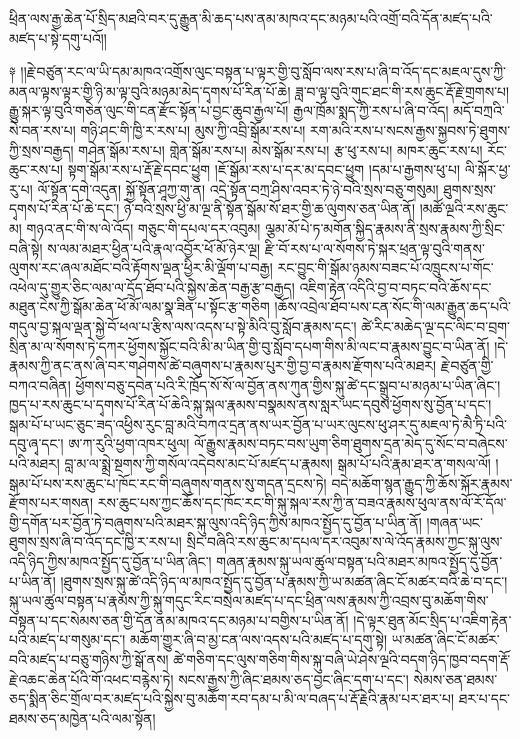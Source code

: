 \documentclass{article}
\begin{document}
ཕྲིན་ལས་རྒྱ་ཆེན་པོ་སྲིད་མཐའི་བར་དུ་རྒྱུན་མི་ཆད་པས་ནམ་མཁའ་དང་མཉམ་པའི་འགྲོ་བའི་དོན་མཛད་པའི་མཛད་པ་སྟེ་དགུ་པའོ།།

༈ །།རྗེ་བཙུན་རང་ལ་ཡི་དམ་མཁའ་འགྲོས་ལུང་བསྟན་པ་ལྟར་གྱི་བུ་སློབ་ལས་རས་པ་ཞི་བ་འོད་དང་མཇལ་དུས་ཀྱི་མནལ་ལྟས་ལྟར་གྱི་ཉི་མ་ལྟ་བུའི་མཉམ་མེད་དྭགས་པོ་རིན་པོ་ཆེ། ཟླ་བ་ལྟ་བུའི་གུང་ཐང་གི་རས་ཆུང་རྡོ་རྗེ་གྲགས་པ། རྒྱུ་སྐར་ལྟ་བུའི་གཅེན་ལུང་གི་ངན་རྫོང་སྟོན་པ་བྱང་ཆུབ་རྒྱལ་པོ། རྒྱལ་ཁྲོམ་སྨད་ཀྱི་རས་པ་ཞི་བ་འོད། མདོ་བཀྲའི་སེ་བན་རས་པ། གཉི་ཤང་གི་ཁྱི་ར་རས་པ། མུས་ཀྱི་འབྲི་སྒོམ་རས་པ། རག་མའི་རས་པ་སངས་རྒྱས་སྐྱབས་ཏེ་ཐུགས་ཀྱི་སྲས་བརྒྱད། གཤེན་སྒོམ་རས་པ། གླེན་སྒོམ་རས་པ། མེས་སྒོམ་རས་པ། རྩ་ཕུ་རས་པ། མཁར་ཆུང་རས་པ། རོང་ཆུང་རས་པ། སྟག་སྒོམ་རས་པ་རྡོ་རྗེ་དབང་ཕྱུག །ཇོ་སྒོམ་རས་པ་དར་མ་དབང་ཕྱུག །དམ་པ་རྒྱགས་ཕུ་པ། ལི་སྐོར་ཕྱ་རུ་པ། ལོ་སྟོན་དགེ་འདུན། སྐྱོ་སྟོན་ཤཱཀྱ་གུ་ན། འདྲེ་སྟོན་བཀྲ་ཤིས་འབར་ཏེ་ཉེ་བའི་སྲས་བཅུ་གསུམ། ཐུགས་སྲས་དྭགས་པོ་རིན་པོ་ཆེ་དང་། ཉེ་བའི་སྲས་ཕྱི་མ་ལྔ་ནི་སྟོན་སྒོམ་སོ་ཐར་གྱི་ཆ་ལུགས་ཅན་ཡིན་ནོ། །མཚོ་ལྔའི་རས་ཆུང་མ། གཉའ་ནང་གི་ས་ལེ་འོད། གཅུང་གི་དཔལ་དར་འབུམ། ལྕམ་མོ་པེ་ཏ་མགོན་སྐྱིད་རྣམས་ནི་སྲས་རྣམས་ཀྱི་སྲིང་བཞི་སྟེ། ས་ལམ་མཐར་ཕྱིན་པའི་རྣལ་འབྱོར་ཕོ་མོ་ཉེར་ལྔ། རྫི་བོ་རས་པ་ལ་སོགས་ཏེ་སྐར་ཕྲན་ལྟ་བུའི་གནས་ལུགས་རང་ཞལ་མཐོང་བའི་རྟོགས་ལྡན་ཕྱིར་མི་ལྡོག་པ་བརྒྱ། རང་བྱུང་གི་སྒོམ་ཉམས་བཟང་པོ་འཁྲུངས་པ་གོང་འཕེལ་དུ་གྱུར་ཅིང་ལམ་ལ་དྲོད་ཐོབ་པའི་སྐྱེས་ཆེན་བརྒྱ་རྩ་བརྒྱད། འཇིག་རྟེན་འདིའི་བྱ་བ་བཏང་བའི་ཆོས་དང་མཐུན་ངེས་ཀྱི་སྒོམ་ཆེན་ཕོ་མོ་ལམ་སྣ་ཟིན་པ་སྟོང་རྩ་གཅིག །ཆོས་འབྲེལ་ཐོབ་པས་ངན་སོང་གི་ལམ་རྒྱུན་ཆད་པའི་གདུལ་བྱ་སྐལ་ལྡན་སྐྱེ་བོ་ཕལ་པ་རྩིས་ལས་འདས་པ་སྟེ་མིའི་བུ་སློབ་རྣམས་དང་། ཚེ་རིང་མཆེད་ལྔ་དང་ལིང་བ་བྲག་སྲིན་མ་ལ་སོགས་ཏེ་དཀར་ཕྱོགས་སྐྱོང་བའི་མི་མ་ཡིན་གྱི་བུ་སློབ་དཔག་གིས་མི་ལང་བ་རྣམས་བྱུང་བ་ཡིན་ནོ། །དེ་རྣམས་ཀྱི་ནང་ནས་ཞི་བར་གཤེགས་ཚེ་བཞུགས་པ་རྣམས་པུར་གྱི་བྱ་བ་རྣམས་རྫོགས་པའི་མཐར། རྗེ་བཙུན་གྱི་བཀའ་བཞིན། ཕྱོགས་བཅུ་དབེན་པའི་རི་ཁྲོད་སོ་སོ་ལ་བྱོན་ནས་ཀུན་གྱིས་སྐུ་ཚེ་དང་སྒྲུབ་པ་མཉམ་པ་ཡིན་ཞིང་། ཁྱད་པ་རས་ཆུང་པ་དྭགས་པོ་རིན་པོ་ཆེའི་སྐུ་སྐལ་རྣམས་བསྣམས་ནས་སླར་ཡང་དབུས་ཕྱོགས་སུ་བྱོན་པ་དང་། སྒམ་པོ་པ་ཡང་ཅུང་ཟད་འཕྱིས་རུང་བླ་མའི་བཀའ་དྲན་ནས་ཡར་བྱོན་པ་ཡར་ལུངས་ཕུ་ཤར་དུ་མཇལ་ཏེ་མཻ་ཏྲི་པའི་དབུ་ཞྭ་དང་། ཨ་ཀ་རུའི་ཕྱག་འཁར་ཕུལ། ལོ་རྒྱུས་རྣམས་བཏང་བས་ཡུག་ཅིག་ཐུགས་དྲན་མེད་དུ་སོང་བ་བཞེངས་པའི་མཐར། བླ་མ་ལ་སྨྲེ་སྔགས་ཀྱི་གསོལ་འདེབས་མང་པོ་མཛད་པ་རྣམས། སྒམ་པོ་པའི་རྣམ་ཐར་ན་གསལ་ལོ། །སྒམ་པོ་པས་རས་ཆུང་པ་ཁོང་རང་གི་བཞུགས་གནས་སུ་གདན་དྲངས་ཏེ། བདེ་མཆོག་སྙན་རྒྱུད་ཀྱི་ཆོས་སྐོར་རྣམས་རྫོགས་པར་གསན། རས་ཆུང་པས་ཀྱང་ཆོས་དང་ཁོང་རང་གི་སྐུ་སྐལ་རས་ཀྱི་ན་བཟའ་རྣམས་ཕུལ་ནས་ལོ་རོ་དོལ་གྱི་དགོན་པར་བྱོན་ཏེ་བཞུགས་པའི་མཐར་སྐུ་ལུས་འདི་ཉིད་ཀྱིས་མཁའ་སྤྱོད་དུ་བྱོན་པ་ཡིན་ནོ། །གཞན་ཡང་ཐུགས་སྲས་ཞི་བ་འོད་དང་ཁྱི་ར་རས་པ། སྲིང་བཞིའི་རས་ཆུང་མ་དཔལ་དར་འབུམ་ས་ལེ་འོད་རྣམས་ཀྱང་སྐུ་ལུས་འདི་ཉིད་ཀྱིས་མཁའ་སྤྱོད་དུ་བྱོན་པ་ཡིན་ཞིང་། གཞན་རྣམས་སྐུ་ཡལ་ཚུལ་བསྟན་པའི་མཐར་མཁའ་སྤྱོད་དུ་བྱོན་པ་ཡིན་ནོ། །ཐུགས་སྲས་སྐུ་ཚེ་འདི་ཉིད་ལ་མཁའ་སྤྱོད་དུ་བྱོན་པ་རྣམས་ཀྱི་ཡ་མཚན་ཞིང་ངོ་མཚར་བའི་ཆེ་བ་དང་། སྐུ་ཡལ་ཚུལ་བསྟན་པ་རྣམས་ཀྱི་སྐུ་གདུང་རིང་བསྲེལ་མཛད་པ་དང་ཕྲིན་ལས་རྣམས་ཀྱི་འབྲས་བུ་མཆོག་གིས་བསྟན་པ་དང་སེམས་ཅན་གྱི་དོན་ནམ་མཁའ་དང་མཉམ་པ་བགྱིས་པ་ཡིན་ནོ། །དེ་ལྟར་ཐུན་མོང་སྲིད་པ་འཇིག་རྟེན་པའི་མཛད་པ་གསུམ་དང་། མཆོག་གྱུར་ཞི་བ་མྱ་ངན་ལས་འདས་པའི་མཛད་པ་དགུ་སྟེ། ཡ་མཚན་ཞིང་ངོ་མཚར་བའི་མཛད་པ་བཅུ་གཉིས་ཀྱི་སྒོ་ནས། ཚེ་གཅིག་དང་ལུས་གཅིག་གིས་སྐུ་བཞི་ཡེ་ཤེས་ལྔའི་བདག་ཉིད་ཁྱབ་བདག་རྡོ་རྗེ་འཆང་ཆེན་པོའི་གོ་འཕང་བརྙེས་ཏེ། སངས་རྒྱས་ཀྱི་ཞིང་ཐམས་ཅད་བྱང་ཞིང་དག་པ་དང་། སེམས་ཅན་ཐམས་ཅད་སྨིན་ཅིང་གྲོལ་བར་མཛད་པའི་སྐྱེས་བུ་མཆོག་རབ་དམ་པ་མི་ལ་བཞད་པ་རྡོ་རྗེའི་རྣམ་པར་ཐར་པ། ཐར་པ་དང་ཐམས་ཅད་མཁྱེན་པའི་ལམ་སྟོན། 
\end{document}
